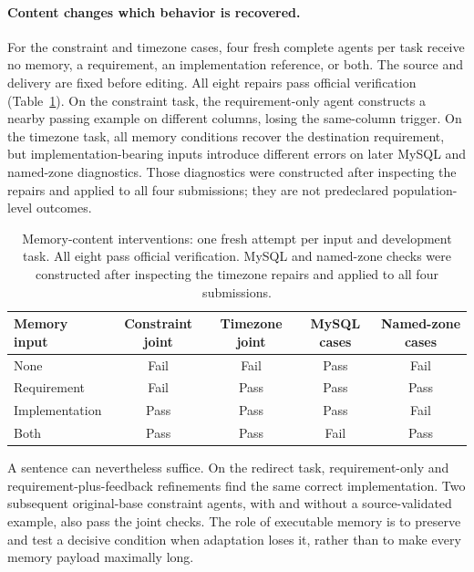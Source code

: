 \paragraph{Content changes which behavior is recovered.}
\label{sec:content}
For the constraint and timezone cases, four fresh complete agents per task
receive no memory, a requirement, an implementation reference, or both.
The source and delivery are fixed before editing. All eight repairs pass
official verification (Table~\ref{tab:memorycontent}). On the constraint task,
the requirement-only agent constructs a nearby passing example on different
columns, losing the same-column trigger. On the timezone task, all memory
conditions recover the destination requirement, but implementation-bearing
inputs introduce different errors on later MySQL and named-zone diagnostics.
Those diagnostics were constructed after inspecting the repairs and applied
to all four submissions; they are not predeclared population-level outcomes.

\begin{table}[!htbp]
\centering
\caption{Memory-content interventions: one fresh attempt per input and development task.
All eight pass official verification. MySQL and named-zone checks were constructed
after inspecting the timezone repairs and applied to all four submissions.}
\label{tab:memorycontent}
\small
\begin{tabular}{lcccc}
\toprule
Memory input & Constraint joint & Timezone joint & MySQL cases & Named-zone cases \\
\midrule
None & Fail & Fail & Pass & Fail \\
Requirement & Fail & Pass & Pass & Pass \\
Implementation & Pass & Pass & Pass & Fail \\
Both & Pass & Pass & Fail & Pass \\
\bottomrule
\end{tabular}
\end{table}

A sentence can nevertheless suffice. On the redirect task, requirement-only
and requirement-plus-feedback refinements find the same correct implementation.
Two subsequent original-base constraint agents, with and without a
source-validated example, also pass the joint checks. The role of executable
memory is to preserve and test a decisive condition when adaptation loses it,
rather than to make every memory payload maximally long.

